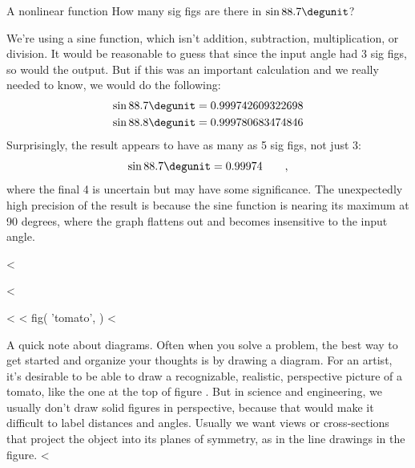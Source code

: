 \begin{eg}{A nonlinear function}
\egquestion How many sig figs are there in $\sin 88.7\degunit$?

\eganswer
We're using a sine function, which isn't addition, subtraction, multiplication, or division.
It would be reasonable to guess that since the input angle had 3 sig figs,
so would the output. But if this was an important calculation and we really needed to know,
we would do the following:
\begin{align*}
  \sin 88.7\degunit &= 0.999742609322698 \\
  \sin 88.8\degunit &= 0.999780683474846
\end{align*}
Surprisingly, the result appears to have as many as 5 sig figs, not just 3:
\begin{equation*}
  \sin 88.7\degunit = 0.99974  \qquad ,
\end{equation*}
where the final 4 is uncertain but may have some significance.
The unexpectedly high precision of the result is because the sine function is nearing its
maximum at 90 degrees, where the graph flattens out and becomes insensitive to the input angle.
\end{eg}

<%

<%

<%
<%
  fig(
    'tomato',
  )
<%

A quick note about diagrams. Often when you solve a problem, the best way to get started
and organize your thoughts is by drawing a diagram. For an artist, it's desirable to be
able to draw a recognizable, realistic, perspective picture of a tomato, like the one at the top of
figure . But in science and engineering, we usually don't draw solid figures in perspective,
because that would make it difficult to label distances and angles. Usually we want views or cross-sections that project
the object into its planes of symmetry, as in the line drawings in the figure.
<%
